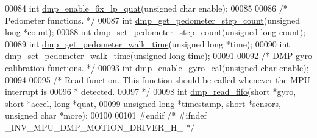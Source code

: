 \begin{DoxyCode}
00084 \textcolor{keywordtype}{int} \hyperlink{group___d_r_i_v_e_r_s_gaac712ef33727433f666b3861894873be}{dmp\_enable\_6x\_lp\_quat}(\textcolor{keywordtype}{unsigned} \textcolor{keywordtype}{char} enable);
00085 
00086 \textcolor{comment}{/* Pedometer functions. */}
00087 \textcolor{keywordtype}{int} \hyperlink{group___d_r_i_v_e_r_s_gad8f4d1a93e0f03d950559501c5a7255b}{dmp\_get\_pedometer\_step\_count}(\textcolor{keywordtype}{unsigned} \textcolor{keywordtype}{long} *count);
00088 \textcolor{keywordtype}{int} \hyperlink{group___d_r_i_v_e_r_s_ga568562c19998f585b1d2ba056cd209db}{dmp\_set\_pedometer\_step\_count}(\textcolor{keywordtype}{unsigned} \textcolor{keywordtype}{long} count);
00089 \textcolor{keywordtype}{int} \hyperlink{group___d_r_i_v_e_r_s_ga62c8e5e99986b0e60ca0dc9a9b9c3fcc}{dmp\_get\_pedometer\_walk\_time}(\textcolor{keywordtype}{unsigned} \textcolor{keywordtype}{long} *time);
00090 \textcolor{keywordtype}{int} \hyperlink{group___d_r_i_v_e_r_s_ga62f469269047f8cba16a2b7f5349acc0}{dmp\_set\_pedometer\_walk\_time}(\textcolor{keywordtype}{unsigned} \textcolor{keywordtype}{long} time);
00091 
00092 \textcolor{comment}{/* DMP gyro calibration functions. */}
00093 \textcolor{keywordtype}{int} \hyperlink{group___d_r_i_v_e_r_s_ga653ebcec6758f006dd89939e8f3c6ebb}{dmp\_enable\_gyro\_cal}(\textcolor{keywordtype}{unsigned} \textcolor{keywordtype}{char} enable);
00094 
00095 \textcolor{comment}{/* Read function. This function should be called whenever the MPU interrupt is}
00096 \textcolor{comment}{ * detected.}
00097 \textcolor{comment}{ */}
00098 \textcolor{keywordtype}{int} \hyperlink{group___d_r_i_v_e_r_s_ga02db5f25359abe84be002c543cdc3803}{dmp\_read\_fifo}(\textcolor{keywordtype}{short} *gyro, \textcolor{keywordtype}{short} *accel, \textcolor{keywordtype}{long} *quat,
00099     \textcolor{keywordtype}{unsigned} \textcolor{keywordtype}{long} *timestamp, \textcolor{keywordtype}{short} *sensors, \textcolor{keywordtype}{unsigned} \textcolor{keywordtype}{char} *more);
00100 
00101 \textcolor{preprocessor}{#endif  }\textcolor{comment}{/* #ifndef \_INV\_MPU\_DMP\_MOTION\_DRIVER\_H\_ */}\textcolor{preprocessor}{}
\end{DoxyCode}
